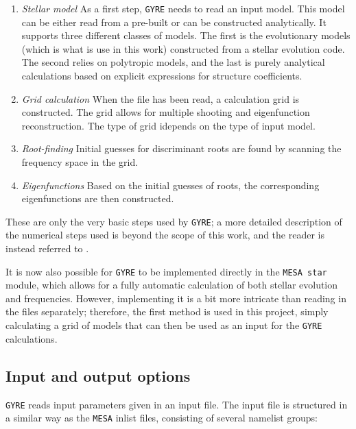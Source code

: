 \begin{enumerate}
    \item \emph{Stellar model} As a first step, \texttt{GYRE} needs to read an input model. This model can be either read from a pre-built or can be constructed analytically. It supports three different classes of models. The first is the evolutionary models (which is what is use in this work) constructed from a stellar evolution code. The second relies on polytropic models, and the last is purely analytical calculations based on explicit expressions for structure coefficients. 
    \item \emph{Grid calculation} When the file has been read, a calculation grid is constructed. The grid allows for multiple shooting and eigenfunction reconstruction. The type of grid idepends on the type of input model. 
    \item \emph{Root-finding} Initial guesses for discriminant roots are found by scanning the frequency space in the grid. 
    \item \emph{Eigenfunctions} Based on the initial guesses of roots, the corresponding eigenfunctions are then constructed. 
\end{enumerate}

These are only the very basic steps used by \texttt{GYRE}; a more detailed description of the numerical steps used is beyond the scope of this work, and the reader is instead referred to \citep{townsend2013}.

It is now also possible for \texttt{GYRE} to be implemented directly in the \texttt{MESA star} module, which allows for a fully automatic calculation of both stellar evolution and frequencies. However, implementing it is a bit more intricate than reading in the files separately; therefore, the first method is used in this project, simply calculating a grid of models that can then be used as an input for the \texttt{GYRE} calculations. 

\subsection{Input and output options}

\texttt{GYRE} reads input parameters given in an input file. The input file is structured in a similar way as the \texttt{MESA} inlist files, consisting of several namelist groups: 

